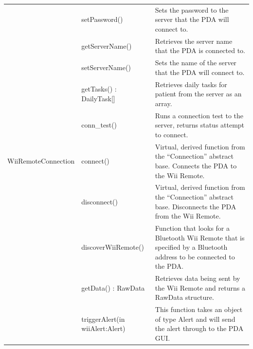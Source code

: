 \documentclass{article}
\begin{document}
\begin{longtable}[t]{|p{1.5in}|p{2in}|p{2.5in}|}
      \cline{2-3}
      
      & setPassword() & Sets the password to the server that the PDA will connect to.  \\
      
      \cline{2-3}
      
      & getServerName() & Retrieves the server name that the PDA is connected to.  \\
      
      \cline{2-3}
      
      & setServerName() & Sets the name of the server that the PDA will connect to.  \\
      
      \cline{2-3}
      
      & getTasks() : DailyTask[] & Retrieves daily tasks for patient from the server as an array.  \\
      
      \cline{2-3}
      
      & conn\_test() & Runs a connection test to the server, returns status attempt to connect.  \\
      
\cline{2-3}

\hline 

WiiRemoteConnection
	  & connect() & Virtual, derived function from the ``Connection'' abstract base. Connects the PDA to the Wii Remote.  \\
      
      \cline{2-3}
      
      & disconnect() & Virtual, derived function from the ``Connection'' abstract base. Disconnects the PDA from the Wii Remote.  \\
      
      \cline{2-3}
      
      & discoverWiiRemote() & Function that looks for a Bluetooth Wii Remote that is specified by a Bluetooth address to be connected to the PDA.  \\
      
      \cline{2-3}
      
      & getData() : RawData & Retrieves data being sent by the Wii Remote and returns a RawData structure.  \\
      
      \cline{2-3}
      
      & triggerAlert(in wiiAlert:Alert) & This function takes an object of type Alert and will send the alert through to the PDA GUI.\\
      

\end{longtable}
\end{document}
